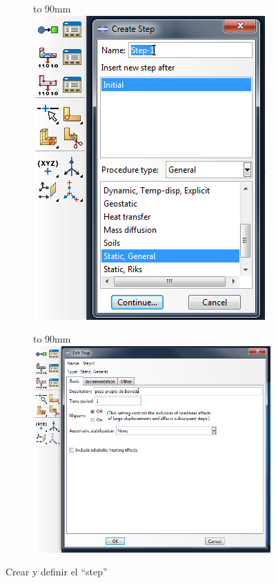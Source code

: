 \documentclass[spanish,a4paper,12pt]{article}
\def\imagebox#1#2{\vtop to #1{\null\hbox{#2}\vfill}}
\begin{document}
\begin{figure}[h!tp]
\centering
\captionsetup[subfigure]{justification=centering,singlelinecheck=false}
  \begin{subfigure}[b]{0.35\textwidth}
  \hspace{10mm}
    \imagebox{90mm}{\includegraphics[scale=0.4]{capturas/15-step.png}}
  \end{subfigure}
  \begin{subfigure}[b]{0.64\textwidth}
  \hspace{6mm}
    \imagebox{90mm}{\includegraphics[scale=0.4]{capturas/16-step.png}}
  \end{subfigure}
\caption{Crear y definir el ``step''}
\label{fig:step}
\end{figure}
\end{document}
